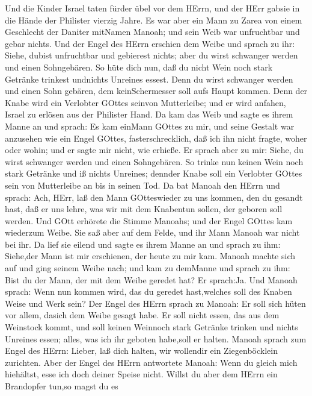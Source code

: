  Und die Kinder Israel taten fürder übel vor dem HErrn, und
der HErr gabsie in die Hände der Philister vierzig Jahre. 
Es war aber ein Mann zu Zarea von einem Geschlecht der Daniter mitNamen
Manoah; und sein Weib war unfruchtbar und gebar nichts.  Und
der Engel des HErrn erschien dem Weibe und sprach zu ihr: Siehe, dubist
unfruchtbar und gebierest nichts; aber du wirst schwanger werden und
einen Sohngebären.  So hüte dich nun, daß du nicht Wein noch
stark Getränke trinkest undnichts Unreines essest.  Denn du
wirst schwanger werden und einen Sohn gebären, dem keinSchermesser soll
aufs Haupt kommen. Denn der Knabe wird ein Verlobter GOttes seinvon
Mutterleibe; und er wird anfahen, Israel zu erlösen aus der Philister
Hand.  Da kam das Weib und sagte es ihrem Manne an und
sprach: Es kam einMann GOttes zu mir, und seine Gestalt war anzusehen
wie ein Engel GOttes, fasterschrecklich, daß ich ihn nicht fragte, woher
oder wohin; und er sagte mir nicht, wie erhieße.  Er sprach
aber zu mir: Siehe, du wirst schwanger werden und einen Sohngebären. So
trinke nun keinen Wein noch stark Getränke und iß nichts Unreines;
dennder Knabe soll ein Verlobter GOttes sein von Mutterleibe an bis in
seinen Tod.  Da bat Manoah den HErrn und sprach: Ach, HErr,
laß den Mann GOtteswieder zu uns kommen, den du gesandt hast, daß er uns
lehre, was wir mit dem Knabentun sollen, der geboren soll werden.
 Und GOtt erhörete die Stimme Manoahs; und der Engel GOttes
kam wiederzum Weibe. Sie saß aber auf dem Felde, und ihr Mann Manoah war
nicht bei ihr.  Da lief sie eilend und sagte es ihrem Manne
an und sprach zu ihm: Siehe,der Mann ist mir erschienen, der heute zu
mir kam.  Manoah machte sich auf und ging seinem Weibe
nach; und kam zu demManne und sprach zu ihm: Bist du der Mann, der mit
dem Weibe geredet hat? Er sprach:Ja.  Und Manoah sprach:
Wenn nun kommen wird, das du geredet hast,welches soll des Knaben Weise
und Werk sein?  Der Engel des HErrn sprach zu Manoah: Er
soll sich hüten vor allem, dasich dem Weibe gesagt habe. 
Er soll nicht essen, das aus dem Weinstock kommt, und soll keinen
Weinnoch stark Getränke trinken und nichts Unreines essen; alles, was
ich ihr geboten habe,soll er halten.  Manoah sprach zum
Engel des HErrn: Lieber, laß dich halten, wir wollendir ein
Ziegenböcklein zurichten.  Aber der Engel des HErrn
antwortete Manoah: Wenn du gleich mich hiehältst, esse ich doch deiner
Speise nicht. Willst du aber dem HErrn ein Brandopfer tun,so magst du es
